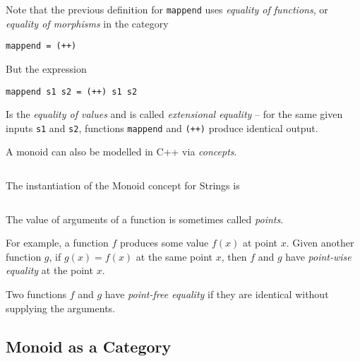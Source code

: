 \begin{remark}
    Note that the previous definition for \texttt{mappend} uses \textit{equality of functions}, or \textit{equality of morphisms} in the  category
    \begin{verbatim}
mappend = (++)
    \end{verbatim}
    
    But the expression
    \begin{verbatim}
mappend s1 s2 = (++) s1 s2
    \end{verbatim}
    Is the \textit{equality of values} and is called \textit{extensional equality} -- for the same given inputs \texttt{s1} and \texttt{s2}, functions \texttt{mappend} and \texttt{(++)} produce identical output.
\end{remark}

\begin{example}
    A monoid can also be modelled in C++ via \textit{concepts}.
    \inputminted{cpp}{content/code-listings/monoid.cpp}
    
    The instantiation of the Monoid concept for Strings is
    \inputminted{cpp}{content/code-listings/string-monoid.cpp}
\end{example}

\begin{definition}
    The value of arguments of a function is sometimes called \textit{points}.
    
    For example, a function $f$ produces some value $f(x)$ at point $x$. Given another function $g$, if $g(x) = f(x)$ at the same point $x$, then $f$ and $g$ have \textit{point-wise equality} at the point $x$.
\end{definition}

\begin{definition}
    Two functions $f$ and $g$ have \textit{point-free equality} if they are identical without supplying the arguments.
\end{definition}

\subsection{Monoid as a Category}

